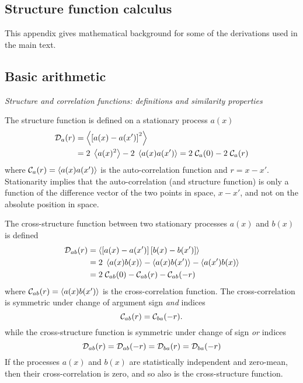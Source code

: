 \documentclass[11pt, oneside]{article}   	%
\begin{document}
\pagebreak
\begin{appendix}
\section{Structure function calculus}
This appendix gives mathematical background for some of the derivations used in the main text.
\subsection{Basic arithmetic}
\label{append:basic}

{\it Structure and correlation functions: definitions and similarity properties}

The structure function is defined on a stationary process $a(x)$
\begin{align}
\label{eqn:structFcnDefn}
{\cal D}_a(r) &= \left< \left [ a(x) - a(x') \right ]^2 \right>  \nonumber \\
                            &= 2\;\left< a(x)^2 \right> - 2\; \left<a(x) a(x')\right> = 2\;{\cal C}_a (0) - 2\;{\cal C}_a (r)
\end{align}
where ${\cal C}_a (r) = \left < a(x) a(x') \right >$ is the auto-correlation function and $r = x-x'$. Stationarity implies that the auto-correlation (and structure function) is only a function of the difference vector of the two points in space, $x-x'$, and not on the absolute position in space.

The cross-structure function between two stationary processes $a(x)$ and $b(x)$ is defined
\begin{align}
{\cal D}_{a b}(r) &= \left< \left [ a(x) - a(x') \right ]\left [ b(x) - b(x')\right] \right>  \nonumber\\
                                             &= 2 \; \left<a(x) b(x)\right> - \left< a(x) b(x') \right> - \left< a(x') b(x) \right> \nonumber \\
                                             &= 2\;{\cal C}_{a b}(0) - {\cal C}_{a b }(r) - {\cal C}_{a b}(-r)
\end{align}
where ${\cal C}_{a b}(r) = \left< a(x) b(x')\right>$ is the cross-correlation function. The cross-correlation is symmetric under change of argument sign {\it and} indices
\begin{equation}
{\cal C}_{a b}(r) = {\cal C}_{ b a}(-r).
\end{equation}
while the cross-structure function is symmetric under change of sign {\it or} indices
\begin{equation}
{\cal D}_{a b}(r) = {\cal D}_{a b}(-r) = {\cal D}_{b a} (r) = {\cal D}_{b a} (-r)
\end{equation}
If the processes $a(x)$ and $b(x)$ are statistically independent and zero-mean, then their cross-correlation is zero, and so also is the cross-structure function.


\end{appendix}
\end{document}
